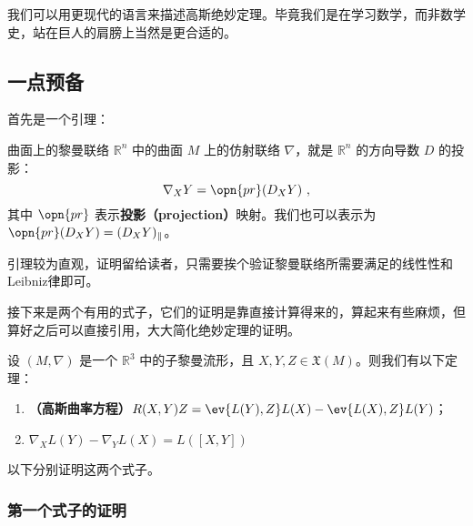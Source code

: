 
\begin{issues}
\issueDraft
{}
\end{issues}



我们可以用更现代的语言来描述高斯绝妙定理。毕竟我们是在学习数学，而非数学史，站在巨人的肩膀上当然是更合适的。

\subsection{一点预备}

首先是一个引理：

\begin{lemma}{曲面上的黎曼联络}\label{Egreg_lem1}
$\mathbb{R}^n$ 中的曲面 $M$ 上的仿射联络 $\nabla$，就是 $\mathbb{R}^n$ 的方向导数 $D$ 的投影：
\begin{equation}
\nabla_XY=\opn{pr}(D_XY)~,
\end{equation}
其中 $\opn{pr}$ 表示\textbf{投影（projection）}映射。我们也可以表示为 $\opn{pr}(D_XY)=(D_XY)_\parallel$。
\end{lemma}

引理较为直观，证明留给读者，只需要挨个验证黎曼联络所需要满足的线性性和Leibniz律即可。

接下来是两个有用的式子，它们的证明是靠直接计算得来的，算起来有些麻烦，但算好之后可以直接引用，大大简化绝妙定理的证明。

\begin{theorem}{}\label{Egreg_the1}
设 $(M, \nabla)$ 是一个 $\mathbb{R}^3$ 中的子黎曼流形，且 $X, Y, Z\in\mathfrak{X}(M)$。则我们有以下定理：
\begin{enumerate}
\item \textbf{（高斯曲率方程）}$R(X, Y)Z=\ev{L(Y), Z}L(X)-\ev{L(X), Z}L(Y)$；
\item $\nabla_XL(Y)-\nabla_YL(X)=L([X, Y])$
\end{enumerate}
\end{theorem}

以下分别证明这两个式子。

\subsubsection{第一个式子的证明}

